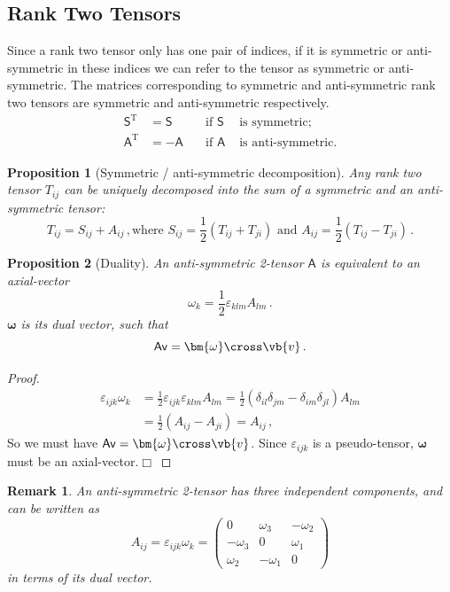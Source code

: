 \documentclass{article}
\theoremstyle{plain}\theoremheaderfont{\normalfont\itshape}\theorembodyfont{\rmfamily}\theoremseparator{.}\newtheorem*{rem}{Remark}\newtheorem*{ex}{Example}\newtheorem*{proof}{Proof}\newtheorem*{altp}{Alternative proof}
\theoremstyle{plain}\theoremheaderfont{\normalfont\bfseries}\theorembodyfont{\rmfamily}\theoremseparator{.}\newtheorem{thm}{Theorem}[section]\newtheorem{lem}[thm]{Lemma}\newtheorem{prop}[thm]{Proposition}\newtheorem*{cor}{Corollary}\newtheorem{defn}[thm]{Definition}\newtheorem{clm}[thm]{Claim}\newtheorem{clminproof}{Claim}
\theoremstyle{break}\theoremheaderfont{\normalfont\itshape}\theorembodyfont{\rmfamily}\theoremseparator{.\medskip}\newtheorem*{proofskip}{Proof}\newtheorem*{exs}{Examples}\newtheorem*{rems}{Remarks}
\theoremstyle{break}\theoremheaderfont{\normalfont\bfseries}\theorembodyfont{\rmfamily}\theoremseparator{.\medskip}\newtheorem{lemskip}[thm]{Lemma}\newtheorem{defnskip}[thm]{Definition}\newtheorem{propskip}[thm]{Proposition}\newtheorem{thmskip}[thm]{Theorem}
\numberwithin{equation}{section}
\newcommand{\qed}{\hfill\ensuremath{\Box}}
\newcommand{\tp}{^\mathrm{T}}
\begin{document}
	\subsection{Rank Two Tensors}
	Since a rank two tensor only has one pair of indices, if it is symmetric or anti-symmetric in these indices we can refer to the tensor as symmetric or anti-symmetric. The matrices corresponding to symmetric and anti-symmetric rank two tensors are symmetric and anti-symmetric respectively.
	\begin{align*}
		\mathsf{S\tp}&=\mathsf{S}\quad &\text{if }\mathsf{S}&\text{ is symmetric;}\\
		\mathsf{A\tp}&=-\mathsf{A}\quad &\text{if }\mathsf{A}&\text{ is anti-symmetric.}
	\end{align*}

	\begin{prop}[Symmetric / anti-symmetric decomposition]
		Any rank two tensor \(T_{ij}\) can be uniquely decomposed into the sum of a symmetric and an anti-symmetric tensor:
		\[T_{ij}=S_{ij}+A_{ij}\,,\text{where }S_{ij}=\frac{1}{2}(T_{ij}+T_{ji})\text{ and }A_{ij}=\frac{1}{2}(T_{ij}-T_{ji})\,.\]
	\end{prop}
	\begin{prop}[Duality]
		An anti-symmetric 2-tensor \(\mathsf{A}\) is equivalent to an axial-vector
		\[\omega_k=\frac{1}{2}\varepsilon_{klm}A_{lm}\,.\]
		\(\bm{\omega}\) is its \textit{dual vector}, such that
		\[\mathsf{Av}=\bm{\omega}\cross\vb{v}\,.\]
	\end{prop}
	\begin{proof}
		\begin{align*}
			\varepsilon_{ijk}\omega_k&=\frac{1}{2}\varepsilon_{ijk}\varepsilon_{klm}A_{lm}=\frac{1}{2}(\delta_{il}\delta_{jm}-\delta_{im}\delta_{jl})A_{lm}\\
			&=\frac{1}{2}(A_{ij}-A_{ji})=A_{ij}\,,
		\end{align*}
		So we must have \(\mathsf{Av}=\bm{\omega}\cross\vb{v}\). Since \(\varepsilon_{ijk}\) is a pseudo-tensor, \(\bm{\omega}\) must be an axial-vector.\qed
	\end{proof}
	\begin{rem}
		An anti-symmetric 2-tensor has three independent components, and can be written as
		\[A_{ij}=\varepsilon_{ijk}\omega_k=\begin{pmatrix}
			0 & \omega_3 & -\omega_2\\
			-\omega_3 & 0 & \omega_1\\
			\omega_2 & -\omega_1 & 0
		\end{pmatrix}\]
		in terms of its dual vector.
	\end{rem}
\end{document}
